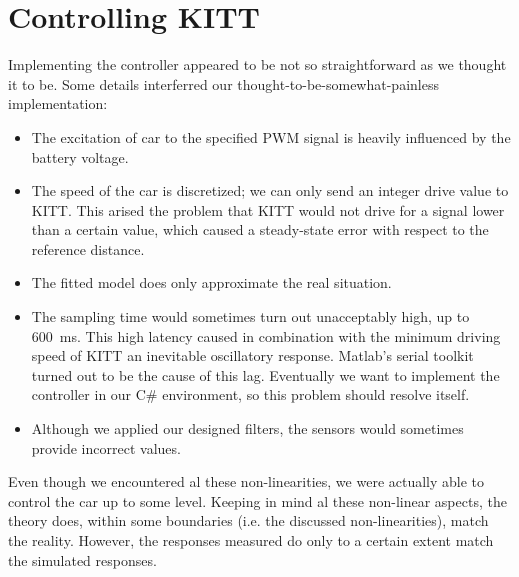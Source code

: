 \documentclass[11pt,titlepage]{report}
\begin{document}
\section{Controlling KITT}
Implementing the controller appeared to be not so straightforward as we thought it to be. Some details interferred our thought-to-be-somewhat-painless implementation:
\begin{itemize}
	\item The excitation of car to the specified PWM signal is heavily influenced by the battery voltage.
	\item The speed of the car is discretized; we can only send an integer drive value to KITT. This arised the problem that KITT would not drive for a signal lower than a certain value, which caused a steady-state error with respect to the reference distance.
	\item The fitted model does only approximate the real situation.
	\item The sampling time would sometimes turn out unacceptably high, up to \SI{600}{ms}. This high latency caused in combination with the minimum driving speed of KITT an inevitable oscillatory response. Matlab's serial toolkit turned out to be the cause of this lag. Eventually we want to implement the controller in our C\# environment, so this problem should resolve itself.
	\item Although we applied our designed filters, the sensors would sometimes provide incorrect values.
\end{itemize}
Even though we encountered al these non-linearities, we were actually able to control the car up to some level. Keeping in mind al these non-linear aspects, the theory does, within some boundaries (i.e. the discussed non-linearities), match the reality. However, the responses measured do only to a certain extent match the simulated responses.
\end{document}

